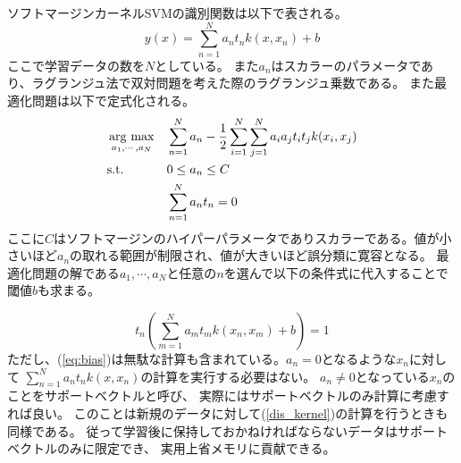 ソフトマージンカーネルSVMの識別関数は以下で表される。
\begin{equation}
    y(x) = \sum_{n=1}^Na_nt_nk(x,x_n) + b
    \label{dis_kernel}
\end{equation}
ここで学習データの数を\(N\)としている。
また\(a_n\)はスカラーのパラメータであり、ラグランジュ法で双対問題を考えた際のラグランジュ乗数である。
また最適化問題は以下で定式化される。
\begin{equation}
    \begin{aligned}
    & \mathop{\rm arg~max}\limits_{a_1,\cdots,a_N}
    & & \sum_{n=1}^N a_n - \frac{1}{2}\sum_{i=1}^N \sum_{j=1}^N a_ia_jt_it_jk(x_i,x_j) \\
    & \text{s.t.}
    & & 0 \leq a_n \leq C  \\
    & & &  \sum_{n=1}^N a_nt_n=0
    \end{aligned}
    \label{eq:kernel SVM}
\end{equation}
ここに\(C\)はソフトマージンのハイパーパラメータでありスカラーである。値が小さいほど\(a_n\)の取れる範囲が制限され、値が大きいほど誤分類に寛容となる。
最適化問題の解である\(a_1,\cdots,a_N\)と任意の\(n\)を選んで以下の条件式に代入することで閾値\(b\)も求まる。

\begin{equation}
    t_n\left( \sum_{m=1}^Na_mt_mk(x_n,x_m) + b \right)=1
    \label{eq:bias}
\end{equation}
ただし、(\ref{eq:bias})は無駄な計算も含まれている。\(a_n=0\)となるような\(x_n\)に対して
\(\sum_{n=1}^Na_nt_nk(x,x_n)\)の計算を実行する必要はない。
\(a_n\neq0\)となっている\(x_n\)のことをサポートベクトルと呼び、
実際にはサポートベクトルのみ計算に考慮すれば良い。
このことは新規のデータに対して(\ref{dis_kernel})の計算を行うときも同様である。
従って学習後に保持しておかねければならないデータはサポートベクトルのみに限定でき、
実用上省メモリに貢献できる。

